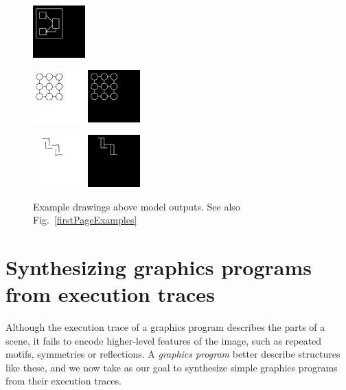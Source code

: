 \documentclass{article}
\begin{document}
\begin{figure}[H]
\begin{minipage}[t]{2.25cm}
    \includegraphics[width = 2cm]{figures/0-parse.png}    
  \end{minipage}
  \begin{minipage}[t]{2.25cm}
    \includegraphics[width = 2cm]{figures/expert-38.png}
    \includegraphics[width = 2cm]{figures/38-parse.png}    
  \end{minipage}
  \begin{minipage}[t]{2.25cm}
    \includegraphics[width = 2cm]{figures/expert-34.png}
    \includegraphics[width = 2cm]{figures/34-parse.png}     
    \end{minipage}
  \caption{Example drawings above model outputs. See also Fig.~\ref{firstPageExamples}}\label{handDrawingExamples}
  \end{figure}

\section{Synthesizing graphics programs from execution traces}
Although the execution trace of a graphics program describes the parts
of a scene, it fails to encode higher-level features of the image,
such as repeated motifs, symmetries or reflections.  A \emph{graphics
  program} better describe structures like these,
and we now take as our goal to synthesize simple graphics programs from
their execution traces.
\end{document}

